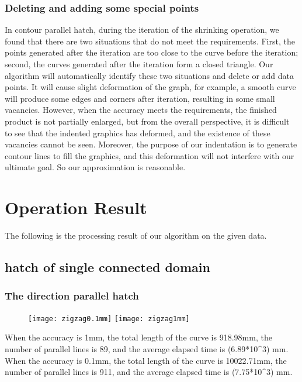 \documentclass{apmcmthesis}
\begin{document}
\subsubsection{Deleting and adding some special points}
In contour parallel hatch, during the iteration of the shrinking operation, we found that there are two situations that do not meet the requirements. First, the points generated after the iteration are too close to the curve before the iteration; second, the curves generated after the iteration form a closed triangle. Our algorithm will automatically identify these two situations and delete or add data points. It will cause slight deformation of the graph, for example, a smooth curve will produce some edges and corners after iteration, resulting in some small vacancies. However, when the accuracy meets the requirements, the finished product is not partially enlarged, but from the overall perspective, it is difficult to see that the indented graphics has deformed, and the existence of these vacancies cannot be seen. Moreover, the purpose of our indentation is to generate contour lines to fill the graphics, and this deformation will not interfere with our ultimate goal. So our approximation is reasonable.




\section{Operation Result}
The following is the processing result of our algorithm on the given data.

\subsection{hatch of single connected domain}


\subsubsection{The direction parallel hatch}


\begin{figure}[!ht]
  \centering
  \texttt{[image: zigzag0.1mm]} \quad \texttt{[image: zigzag1mm]}
  \caption{}
  \caption{}
\end{figure}

When the accuracy is 1mm, the total length of the curve is 918.98mm, the number of parallel lines is 89, and the average elapsed time is (6.89*10^3) mm. When the accuracy is 0.1mm, the total length of the curve is 10022.71mm, the number of parallel lines is 911, and the average elapsed time is (7.75*10^3) mm.
\end{document}
